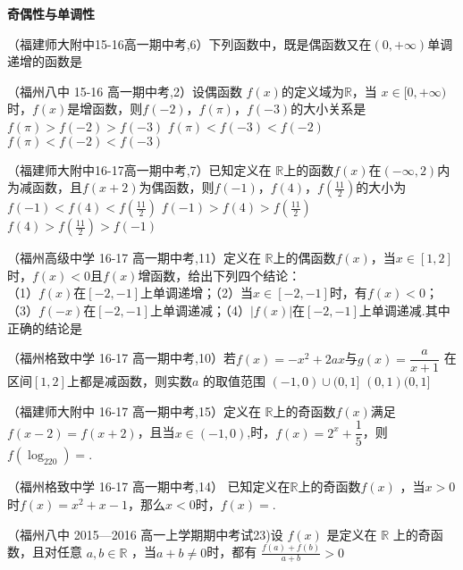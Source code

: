   \begin{exercise}{\bf 奇偶性与单调性}
    \item
      （福建师大附中15-16高一期中考,6）下列函数中，既是偶函数又在$(0,+\infty)$单调递增的函数是\xz
    \item
      （福州八中 15-16 高一期中考,2）设偶函数 $f(x)$的定义域为$\mathbb{R}$，当 $x\in[0,+\infty)$时，$f(x)$是增函数，则$f(-2)$，$f(\pi)$，$f(-3)$的大小关系是\xz
          {$f(\pi)>f(-2)>f(-3)$}
          {$f(\pi)<f(-3)<f(-2)$}
          {$f(\pi)<f(-2)<f(-3)$}
    \item
      （福建师大附中16-17高一期中考,7）已知定义在 $\mathbb{R}$上的函数$f(x)$在$(-\infty,2)$内为减函数，且$f(x+2)$为偶函数，则$f(-1)$，$f(4)$，$f(\frac{11}2)$的大小为\xz
          {$f(-1)<f(4)<f(\frac{11}2)$}
          {$f(-1)>f(4)>f(\frac{11}2)$}
          {$f(4)>f(\frac{11}2)>f(-1)$}
    \item
      （福州高级中学 16-17 高一期中考,11）定义在 $\mathbb{R}$上的偶函数$f(x)$，当$x\in[1,2]$时，$f(x)<0$且$f(x)$增函数，给出下列四个结论：\\
      （1）$f(x)$在$[-2,-1]$上单调递增；\hspace{4em}（2）当$x\in[-2,-1]$时，有$f(x)<0$；\\
      （3）$f(-x)$在$[-2,-1]$上单调递减；\hspace{4em}（4）$|f(x)|$在$[-2,-1]$上单调递减.其中正确的结论是\xz
    \item
      （福州格致中学 16-17 高一期中考,10）若$f(x)=-x^2+2ax$与$g(x)=\dfrac a{x+1}$ 在区间$[1,2]$上都是减函数，则实数$a$ 的取值范围\xz
          {$(-1,0)\cup(0,1]$}
          {$(0,1)$}{$(0,1]$}
    \item
      （福建师大附中 16-17 高一期中考,15）定义在 $\mathbb{R}$上的奇函数$f(x)$满足 $f(x-2)=f(x+2)$，且当$x\in(-1,0)$,时，$f(x)=2^x+\dfrac15$，则$f(\log_220)=$\tk.\\
    \item
      （福州格致中学 16-17 高一期中考,14） 已知定义在$\mathbb{R}$上的奇函数$f(x)$ ，当$x>0$时$f(x)=x^2+x-1$，那么$x<0$时，$f(x)=$\tk.\\
    \item%
      （福州八中 2015—2016 高一上学期期中考试23)设 $f (x )$ 是定义在 $\mathbb{R}$ 上的奇函数，且对任意 $a,b\in \mathbb{R}$ ，当$a+b\neq0$时，都有 $\frac{f(a)+f(b)}{a+b}>0$\\

\end{exercise}
